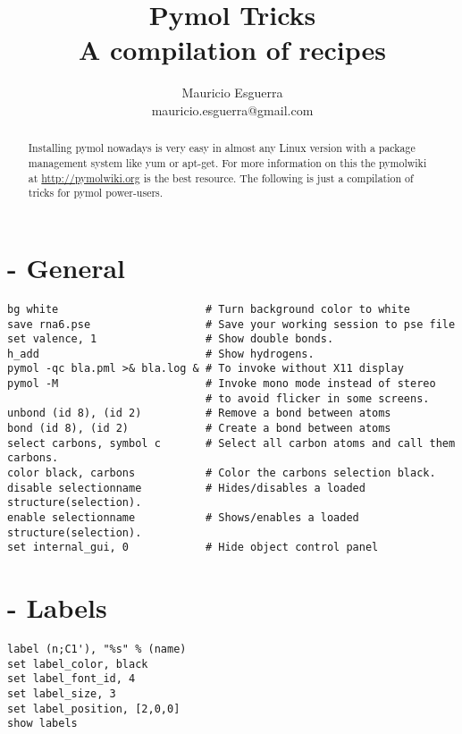 \documentclass[10pt, oneside, pdftex]{article}
\title{Pymol Tricks \\ 
	\large \vspace*{-10pt}A compilation of recipes\vspace*{10pt}}
\author{%
	Mauricio Esguerra \\
	mauricio.esguerra@gmail.com \\
	\vspace{20pt}
	}
\makeatletter
\def\printtitle{%
  {\color{bl} \centering \huge \sc \textbf{\@title}\par}}	%
\def\printauthor{%
    {\centering \small \@author}}				%
\makeatother
\begin{document}
\printtitle 

\printauthor

\begin{abstract}
\noindent Installing pymol nowadays is very easy in almost any Linux version with a
package management system like yum or apt-get. For more information on this the
pymolwiki at \url{http://pymolwiki.org} is the best resource. The following is 
just a compilation of tricks for pymol power-users.
\end{abstract}


\section*{ - General}
\begin{Verbatim}
bg white                       # Turn background color to white
save rna6.pse                  # Save your working session to pse file
set valence, 1                 # Show double bonds.
h_add                          # Show hydrogens.  
pymol -qc bla.pml >& bla.log & # To invoke without X11 display
pymol -M                       # Invoke mono mode instead of stereo
                               # to avoid flicker in some screens.
unbond (id 8), (id 2)          # Remove a bond between atoms
bond (id 8), (id 2)            # Create a bond between atoms
select carbons, symbol c       # Select all carbon atoms and call them carbons.
color black, carbons           # Color the carbons selection black.
disable selectionname          # Hides/disables a loaded structure(selection).
enable selectionname           # Shows/enables a loaded structure(selection).
set internal_gui, 0            # Hide object control panel
\end{Verbatim}

\section*{ - Labels}
\begin{Verbatim}
label (n;C1'), "%s" % (name)
set label_color, black
set label_font_id, 4
set label_size, 3
set label_position, [2,0,0]
show labels
\end{Verbatim}
\end{document}
